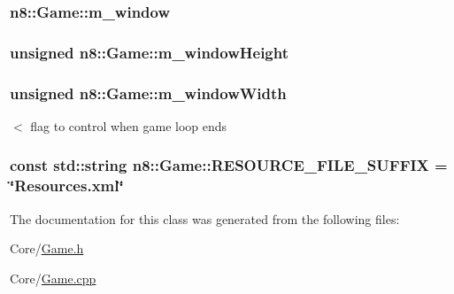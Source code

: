 \hypertarget{classn8_1_1_game_a091449bc88fce9f180acbcca101ebdbe}{
\subsubsection[{m\-\_\-window}]{ n8\-::\-Game\-::m\-\_\-window\hspace{0.3cm}{\ttfamily [private]}}}\label{classn8_1_1_game_a091449bc88fce9f180acbcca101ebdbe}
\hypertarget{classn8_1_1_game_af3e88c8758f2e09303408637cbbf656f}{
\subsubsection[{m\-\_\-window\-Height}]{\setlength{\rightskip}{0pt plus 5cm}unsigned n8\-::\-Game\-::m\-\_\-window\-Height\hspace{0.3cm}{\ttfamily [private]}}}\label{classn8_1_1_game_af3e88c8758f2e09303408637cbbf656f}
\hypertarget{classn8_1_1_game_ae1e6c5b939a154d09ed65496156090ec}{
\subsubsection[{m\-\_\-window\-Width}]{\setlength{\rightskip}{0pt plus 5cm}unsigned n8\-::\-Game\-::m\-\_\-window\-Width\hspace{0.3cm}{\ttfamily [private]}}}\label{classn8_1_1_game_ae1e6c5b939a154d09ed65496156090ec}
$<$ flag to control when game loop ends \hypertarget{classn8_1_1_game_a4ba4f2b01a5cc821bdfeb371141eb7c5}{
\subsubsection[{R\-E\-S\-O\-U\-R\-C\-E\-\_\-\-F\-I\-L\-E\-\_\-\-S\-U\-F\-F\-I\-X}]{\setlength{\rightskip}{0pt plus 5cm}const std\-::string n8\-::\-Game\-::\-R\-E\-S\-O\-U\-R\-C\-E\-\_\-\-F\-I\-L\-E\-\_\-\-S\-U\-F\-F\-I\-X = \char`\"{}Resources.\-xml\char`\"{}\hspace{0.3cm}{\ttfamily [private]}}}\label{classn8_1_1_game_a4ba4f2b01a5cc821bdfeb371141eb7c5}


The documentation for this class was generated from the following files\-:\begin{DoxyCompactItemize}
\item 
Core/\hyperlink{_game_8h}{Game.\-h}\item 
Core/\hyperlink{_game_8cpp}{Game.\-cpp}\end{DoxyCompactItemize}

